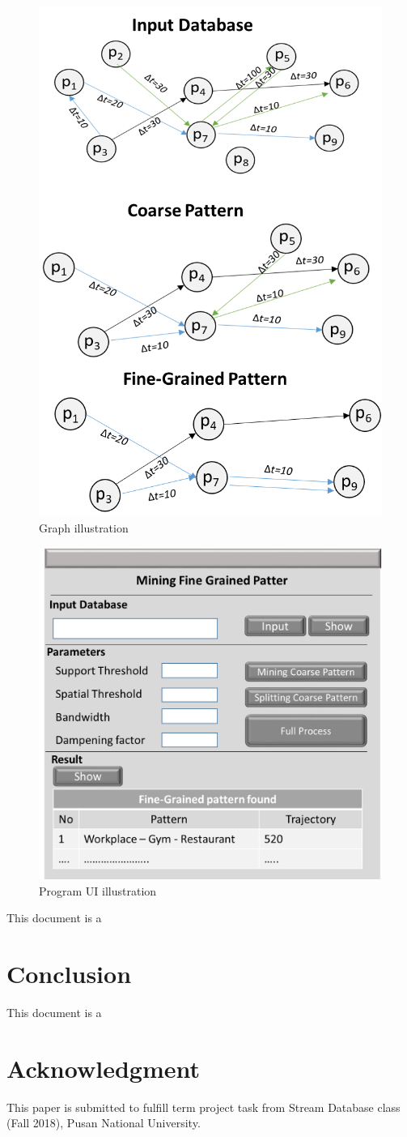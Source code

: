 \documentclass[conference]{IEEEtran}
\begin{document}
\begin{figure}[!ht]
\centering
\includegraphics[width=0.5\linewidth]{GraphRepresentation}
\caption{Graph illustration}
\label{fig:graph}
\end{figure}

\begin{figure}[!ht]
\centering
\includegraphics[width=0.5\linewidth]{GUI}
\caption{Program UI illustration}
\label{fig:javagui}
\end{figure}


This document is a \cite{sdbproject}

\section{Conclusion}
This document is a \cite{zhang2014splitter}

\section*{Acknowledgment}
This paper is submitted to fulfill term project task from Stream Database class (Fall 2018), Pusan National University.



\end{document}
